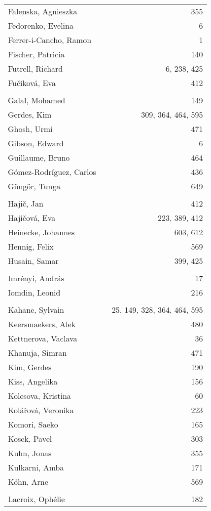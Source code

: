 \documentclass{easychair}
\begin{document}
\begin{longtable}{lp{10em}r}
Falenska, Agnieszka & & 355 
\\
Fedorenko, Evelina & & 6 
\\
Ferrer-i-Cancho, Ramon & & 1 
\\
Fischer, Patricia & & 140 
\\
Futrell, Richard & & 6, 238, 425 
\\
Fu\v{c}\'ikov\'a, Eva & & 412 
\\
\\
Galal, Mohamed & & 149 
\\
Gerdes, Kim & & 309, 364, 464, 595 
\\
Ghosh, Urmi & & 471 
\\
Gibson, Edward & & 6 
\\
Guillaume, Bruno & & 464 
\\
G\'omez-Rodr\'iguez, Carlos & & 436 
\\
G\"ung\"or, Tunga & & 649 
\\
\\
Haji\v{c}, Jan & & 412 
\\
Haji\v{c}ov\'a, Eva & & 223, 389, 412 
\\
Heinecke, Johannes & & 603, 612 
\\
Hennig, Felix & & 569 
\\
Husain, Samar & & 399, 425 
\\
\\
Imr\'enyi, Andr\'as & & 17 
\\
Iomdin, Leonid & & 216 
\\
\\
Kahane, Sylvain & & 25, 149, 328, 364, 464, 595 
\\
Keersmaekers, Alek & & 480 
\\
Kettnerova, Vaclava & & 36 
\\
Khanuja, Simran & & 471 
\\
Kim, Gerdes & & 190 
\\
Kiss, Angelika & & 156 
\\
Kolesova, Kristina & & 60 
\\
Kol\'a\v{r}ov\'a, Veronika & & 223 
\\
Komori, Saeko & & 165 
\\
Kosek, Pavel & & 303 
\\
Kuhn, Jonas & & 355 
\\
Kulkarni, Amba & & 171 
\\
K\"ohn, Arne & & 569 
\\
\\
Lacroix, Oph\'elie & & 182 
\\

\end{longtable}
\end{document}

